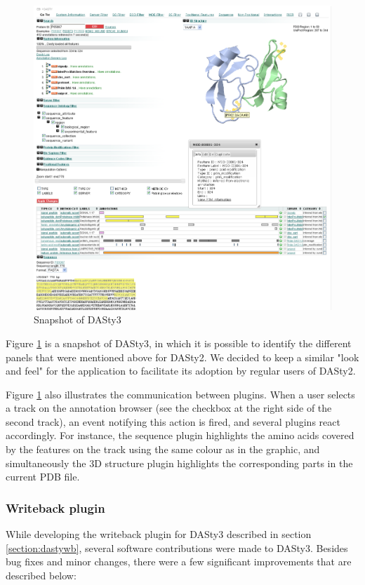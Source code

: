 \begin{figure}
\centering
\includegraphics[width=\textwidth]{figures/dasty3.png} 
\caption{Snapshot of DASty3}  \label{fig:dasty3}
\end{figure}


Figure \ref{fig:dasty3} is a snapshot of DASty3, in which it is possible to identify the different panels that were mentioned above for DASty2. We decided to keep a similar "look and feel" for the application to facilitate its adoption by regular users of DASty2. 

Figure \ref{fig:dasty3} also illustrates the communication between plugins. When a user selects a track on the annotation browser (see the checkbox at the right side of the second track), an event notifying this action is fired, and several plugins react accordingly. For instance, the sequence plugin highlights the amino acids covered by the features on the track using the same colour as in the graphic, and simultaneously the 3D structure plugin highlights the corresponding parts in the current PDB file.

\subsubsection{Writeback plugin}
While developing the writeback plugin for DASty3 described in section \ref{section:dastywb}, several software contributions were made to DASty3. Besides bug fixes and minor changes, there were a few significant improvements that are described below:

